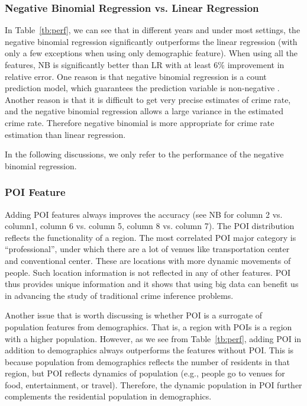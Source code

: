 \subsubsection{Negative Binomial Regression vs. Linear Regression}
In Table~\ref{tb:perf},  we can see that in different years and under most settings, the negative binomial regression significantly outperforms the linear regression (with only a few exceptions when using only demographic feature). When using all the features, NB is significantly better than LR with at least $6\%$ improvement in relative error.
One reason is that negative binomial regression is a count prediction model, which guarantees the prediction variable is non-negative . Another reason is that it is difficult to get very precise estimates of crime rate, and the negative binomial regression allows a large variance in the estimated crime rate. Therefore negative binomial is more appropriate for crime rate estimation than linear regression.

In the following discussions, we only refer to the performance of the negative binomial regression.




\subsubsection{POI Feature} Adding POI features always improves the accuracy (see NB for column 2 vs. column1, column 6 vs. column 5, column 8 vs. column 7). The POI distribution reflects the functionality of a region. The most correlated POI major category is ``professional'', under which there are a lot of venues like transportation center and conventional center. These are locations with more dynamic movements of people. Such location information is not reflected in any of other features. POI thus provides  unique information and it shows that using big data can benefit us in advancing the study of traditional crime inference problems. 

Another issue that is worth discussing is whether POI is a surrogate of population features from demographics. That is, a region with POIs is a region with a higher population. However, as we see from Table~\ref{tb:perf}, adding POI in addition to demographics always outperforms the features without POI. This is because population from demographics reflects the number of residents in that region, but POI reflects dynamics of population (e.g., people go to venues for food, entertainment, or travel). Therefore, the dynamic population in POI further complements the residential population in demographics.




